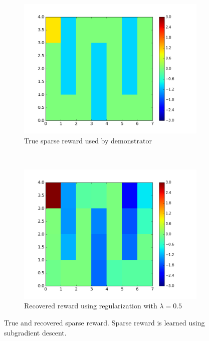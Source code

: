 \documentclass[10pt,a4paper]{article}
\begin{document}
\begin{figure}
    \centering
    \begin{subfigure}[b]{0.45\textwidth}
        \includegraphics[width=\textwidth]{figs/true_reward.png}
        \caption{True sparse reward used by demonstrator}
        \label{subfig:true_sparse_reward}
    \end{subfigure}
    ~ %
    \begin{subfigure}[b]{0.45\textwidth}
        \includegraphics[width=\textwidth]{figs/recovered_reward_lam0_5.png}
        \caption{Recovered reward using regularization with $\lambda = 0.5$}
        \label{subfig:recovered_sparse_reward}
    \end{subfigure}
    \caption{True and recovered sparse reward. Sparse reward is learned using subgradient descent.}\label{fig:sparse_reward}
\end{figure}
\end{document}
